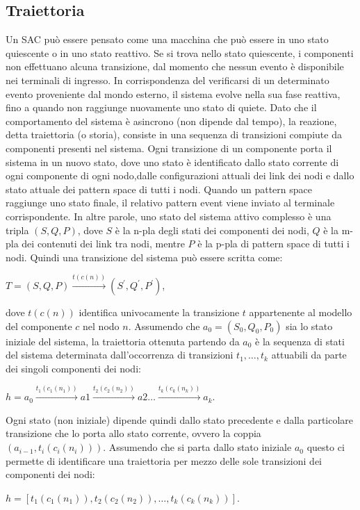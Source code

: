 \subsection{Traiettoria}
Un SAC può essere pensato come una macchina che può essere in uno stato quiescente o in uno stato reattivo. Se si trova nello stato quiescente, i componenti non effettuano alcuna transizione, dal momento che nessun evento è disponibile nei terminali di ingresso. In corrispondenza del verificarsi di un determinato evento proveniente dal mondo esterno, il sistema evolve nella sua fase reattiva, fino a quando non raggiunge nuovamente uno stato di quiete. Dato che il comportamento del sistema è asincrono (non dipende dal tempo), la reazione, detta traiettoria (o storia), consiste in una sequenza di transizioni compiute da componenti presenti nel sistema.
Ogni transizione di un componente porta il sistema in un nuovo stato, dove uno stato è identificato dallo stato corrente di ogni componente di ogni nodo,dalle configurazioni attuali dei link dei nodi e dallo stato attuale dei pattern space di tutti i nodi. Quando un pattern space raggiunge uno stato finale, il relativo pattern event viene inviato al terminale corrispondente.
In altre parole, uno stato del sistema attivo complesso è una tripla $(S,Q,P)$, dove $S$ è la n-pla degli stati dei componenti dei nodi, $Q$ è la m-pla dei contenuti dei link tra nodi, mentre $P$ è la p-pla di pattern space di tutti i nodi.
Quindi una transizione del sistema può essere scritta come:
\begin{center}
	$T = (S,Q,P) \xrightarrow {t(c(n))} (S^\prime,Q^\prime,P^\prime)$,
\end{center}
dove $t(c(n))$ identifica univocamente la transizione $t$ appartenente al modello del componente $c$ nel nodo $n$.
Assumendo che $a_0 = (S_0,Q_0,P_0)$ sia lo stato iniziale del sistema, la traiettoria ottenuta partendo da $a_0$ è la sequenza di stati del sistema determinata dall'occorrenza di transizioni $t_1, \ldots , t_k$ attuabili da parte dei singoli componenti dei nodi:
\begin{center}
$h = a_0 \xrightarrow{t_1(c_1(n_1))} a1 \xrightarrow{t_2(c_2(n_2))} a2 \ldots \xrightarrow{t_k(c_k(n_k))} a_k$.
\end{center}

Ogni stato (non iniziale) dipende quindi dallo stato precedente e dalla particolare transizione che lo porta allo stato corrente, ovvero la coppia $(a_{i-1},t_i(c_i(n_i)))$. Assumendo che si parta dallo stato iniziale $a_0$ questo ci permette di identificare una traiettoria per mezzo delle sole transizioni dei componenti dei nodi:
\begin{center}
$h = [t_1(c_1(n_1)),t_2(c_2(n_2)), \ldots , t_k(c_k(n_k))]$.
\end{center}


